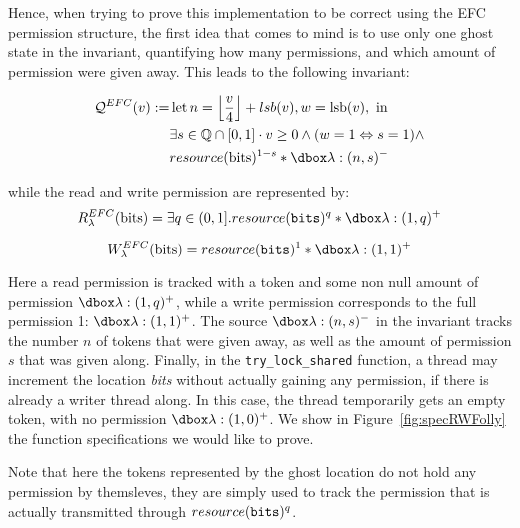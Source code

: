 Hence, when trying to prove this implementation to be correct using the EFC permission structure, the first idea that comes to mind is to use only one ghost state in the invariant, quantifying how many permissions, and which amount of permission were given away. This leads to the following invariant:

$$\begin{aligned} \mathcal{Q}^{EFC}(v) :=& \operatorname{let} n=\left\lfloor\frac{v}{4}\right\rfloor + lsb(v), w=\operatorname{lsb}(v), \text { in } \\ & \exists s \in \mathbb{Q} \cap[0,1] \cdot v \geq 0 \wedge (w=1 \Leftrightarrow s=1) \wedge \\ & resource(\mathrm{bits})^{1-s} * \ghost{\lambda :(n, s)^{-}}
\end{aligned} $$

while the read and write permission are represented by:
$$\rPerm = \exists q \in (0, 1].\ress{q}* \ghost{\lambda : (1, q)^+}$$

$$\wPerm = \ress{1} * \ghost{\lambda:(1, 1)^+}$$

Here a read permission is tracked with a token and some non null amount of permission $\ghost{\lambda :(1, q)^+}$, while a write permission corresponds to the full permission 1: $\ghost{\lambda:(1, 1)^+}$. The source $\ghost{\lambda :(n, s)^{-}}$ in the invariant tracks the number $n$ of tokens that were given away, as well as the amount of permission $s$ that was given along. Finally, in the \texttt{try\_lock\_shared} function, a thread may increment the location \emph{bits} without actually gaining any permission, if there is already a writer thread along. In this case, the thread temporarily gets an empty token, with no permission $\ghost{\lambda:(1, 0)^+}$.  We show in Figure~\ref{fig:specRWFolly} the function specifications we would like to prove. 

Note that here the tokens represented by the ghost location do not hold any permission by themsleves, they are simply used to track the permission that is actually transmitted through $resource(\texttt{bits})^{q}$.

